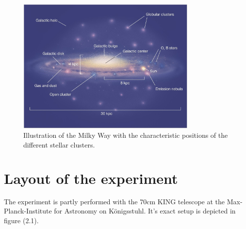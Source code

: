  \begin{figure}[H]
 	\centering
 	\includegraphics[width=0.8\textwidth]{figures/Introduction/milky_way}
 	\caption[Illustration of the Milky Way]{Illustration of the Milky Way with the characteristic positions of the different stellar clusters.\footnotemark}	
 \end{figure}
 
 \chapter{Layout of the experiment}
 The experiment is partly performed with the 70cm KING telescope at the Max-Planck-Institute for Astronomy on Königsstuhl. It's exact setup is depicted in figure (\color{mydarkblue}2.1\normalcolor).

